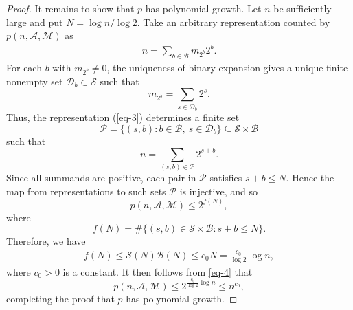 \documentclass[10pt,a4paper]{amsart}
\begin{document}
\begin{proof}
It remains to show that $p$ has polynomial growth. Let $n$ be sufficiently large and put $N=\log n/\log 2$. Take an arbitrary representation counted by $p(n,\mathcal{A},\mathcal{M})$ as
\begin{align}\label{eq-3}
n=\sum_{b\in\mathscr{B}}m_{2^b}2^b.
\end{align}
For each $b$ with $m_{2^b}\ne0$, the uniqueness of binary expansion gives a unique finite nonempty set $\mathcal{D}_b\subset\mathscr{S}$ such that
$$
m_{2^b}=\sum_{s\in\mathcal{D}_b}2^s.
$$
Thus, the representation (\ref{eq-3}) determines a finite set
$$
\mathcal{P}=\big\{(s,b): b\in\mathscr{B},\ s\in\mathcal{D}_b\big\}\subseteq \mathscr{S}\times\mathscr{B}
$$
such that
$$
n=\sum_{(s,b)\in\mathcal{P}}2^{s+b}.
$$
Since all summands are positive, each pair in $\mathcal{P}$ satisfies $s+b\le N$. Hence the map from representations to such sets $\mathcal{P}$ is injective, and so
$$
p(n,\mathcal{A},\mathcal{M})\le 2^{f(N)},
$$
where
$$
f(N)=\#\big\{(s,b)\in\mathscr{S}\times\mathscr{B}:s+b\le N\big\}.
$$
Therefore, we have
\begin{align}\label{eq-4}
f(N)\le \mathscr{S}(N)\mathscr{B}(N)
\le c_0 N=\frac{c_0}{\log 2} \log n,
\end{align}
where $c_0>0$ is a constant. It then follows from \eqref{eq-4} that
$$
p(n,\mathcal{A},\mathcal{M})\le 2^{\frac{c_0}{\log 2}\log n}\le n^{c_0},
$$
completing the proof that $p$ has polynomial growth.
\end{proof}
\end{document}
